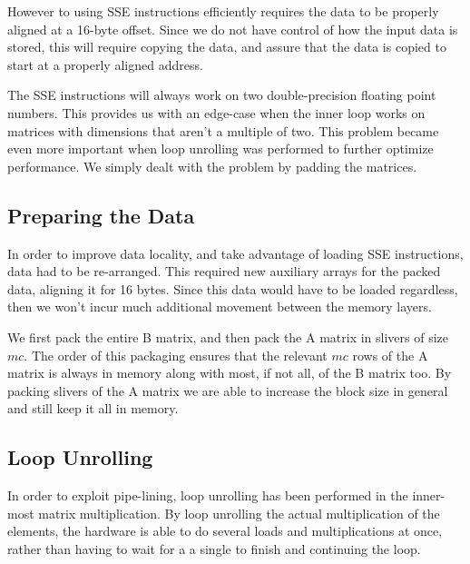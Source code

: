 \documentclass[a4paper,11pt,oneside]{book}
\begin{document}
However to using SSE instructions efficiently requires the data to be properly
aligned at a 16-byte offset.
Since we do not have control of how the input data is stored, this will require 
copying the data, and assure that the data is copied to start at a properly 
aligned address. 

The SSE instructions will always work on two double-precision floating point
numbers. This provides us with an edge-case when the inner loop works on
matrices with dimensions that aren't a multiple of two. This problem became even
more important when loop unrolling was performed to further optimize
performance. We simply dealt with the problem by padding the matrices.


\subsection{Preparing the Data}

In order to improve data locality, and take advantage of loading SSE
instructions, data had to be re-arranged. This required new auxiliary arrays for
the packed data, aligning it for 16 bytes. Since this data would have to be
loaded regardless, then we won't incur much additional movement between the 
memory layers. %

We first pack the entire B matrix, and then pack the A matrix in slivers of size
$mc$. The order of this packaging ensures that the relevant $mc$ rows of the A
matrix is always in memory along with most, if not all, of the B matrix too. By
packing slivers of the A matrix we are able to increase the block size in
general and still keep it all in memory.

\subsection{Loop Unrolling}


In order to exploit pipe-lining, loop unrolling has been performed in the inner-
most matrix multiplication. By loop unrolling the actual multiplication of the
elements, the hardware is able to do several loads and multiplications at once,
rather than having to wait for a a single to finish and continuing the loop.
\end{document}
